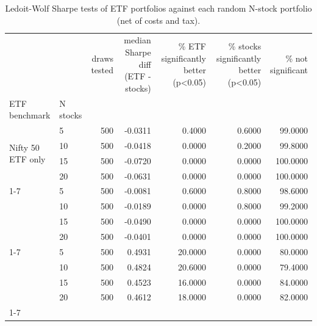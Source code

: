 \begin{table}
\caption{Ledoit-Wolf Sharpe tests of ETF portfolios against each random N-stock portfolio (net of costs and tax).}
\label{tab:T10_tests_etf_vs_stocks}
\begin{tabular}{llrrrrr}
\toprule
 &  & draws tested & median Sharpe diff (ETF - stocks) & \% ETF significantly better (p<0.05) & \% stocks significantly better (p<0.05) & \% not significant \\
ETF benchmark & N stocks &  &  &  &  &  \\
\midrule
\multirow[t]{4}{*}{Nifty 50 ETF only} & 5 & 500 & -0.0311 & 0.4000 & 0.6000 & 99.0000 \\
 & 10 & 500 & -0.0418 & 0.0000 & 0.2000 & 99.8000 \\
 & 15 & 500 & -0.0720 & 0.0000 & 0.0000 & 100.0000 \\
 & 20 & 500 & -0.0631 & 0.0000 & 0.0000 & 100.0000 \\
\cline{1-7}
\multirow[t]{4}{*}{Equity ETFs 1/N} & 5 & 500 & -0.0081 & 0.6000 & 0.8000 & 98.6000 \\
 & 10 & 500 & -0.0189 & 0.0000 & 0.8000 & 99.2000 \\
 & 15 & 500 & -0.0490 & 0.0000 & 0.0000 & 100.0000 \\
 & 20 & 500 & -0.0401 & 0.0000 & 0.0000 & 100.0000 \\
\cline{1-7}
\multirow[t]{4}{*}{1/N ETF} & 5 & 500 & 0.4931 & 20.0000 & 0.0000 & 80.0000 \\
 & 10 & 500 & 0.4824 & 20.6000 & 0.0000 & 79.4000 \\
 & 15 & 500 & 0.4523 & 16.0000 & 0.0000 & 84.0000 \\
 & 20 & 500 & 0.4612 & 18.0000 & 0.0000 & 82.0000 \\
\cline{1-7}
\bottomrule
\end{tabular}
\end{table}
